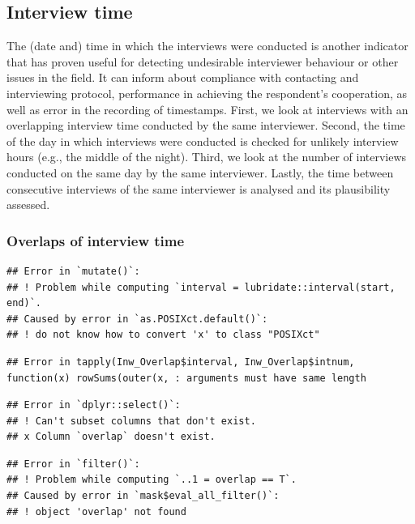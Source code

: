 \documentclass[
  11pt,
  a4paperpaper,
]{article}
\begin{document}
\newpage

\hypertarget{sec:int_times}{%
\subsection{Interview time}\label{sec:int_times}}

The (date and) time in which the interviews were conducted is another
indicator that has proven useful for detecting undesirable interviewer
behaviour or other issues in the field. It can inform about compliance
with contacting and interviewing protocol, performance in achieving the
respondent's cooperation, as well as error in the recording of
timestamps. First, we look at interviews with an overlapping interview
time conducted by the same interviewer. Second, the time of the day in
which interviews were conducted is checked for unlikely interview hours
(e.g., the middle of the night). Third, we look at the number of
interviews conducted on the same day by the same interviewer. Lastly,
the time between consecutive interviews of the same interviewer is
analysed and its plausibility assessed.

\hypertarget{sec:overlaps}{%
\subsubsection{Overlaps of interview time}\label{sec:overlaps}}

\begin{verbatim}
## Error in `mutate()`:
## ! Problem while computing `interval = lubridate::interval(start, end)`.
## Caused by error in `as.POSIXct.default()`:
## ! do not know how to convert 'x' to class "POSIXct"
\end{verbatim}

\begin{verbatim}
## Error in tapply(Inw_Overlap$interval, Inw_Overlap$intnum, function(x) rowSums(outer(x, : arguments must have same length
\end{verbatim}

\begin{verbatim}
## Error in `dplyr::select()`:
## ! Can't subset columns that don't exist.
## x Column `overlap` doesn't exist.
\end{verbatim}

\begin{verbatim}
## Error in `filter()`:
## ! Problem while computing `..1 = overlap == T`.
## Caused by error in `mask$eval_all_filter()`:
## ! object 'overlap' not found
\end{verbatim}
\end{document}
